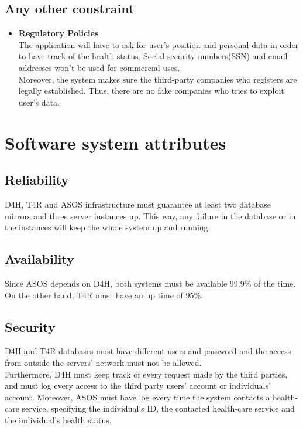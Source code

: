 \documentclass[a4paper, hidelinks, 12pt]{report}
\begin{document}
	\subsection{Any other constraint}
	\begin{itemize}
		\item{} \textbf{Regulatory Policies}\\
		The application will have to ask for user's position and personal data in order to have track of the health status. Social security numbers(SSN) and email addresses won't be used for commercial uses.\\
		
		Moreover, the system makes sure the third-party companies who registers are legally established. Thus, there are no fake companies who tries to exploit user's data.
	\end{itemize}
	
	\section{Software system attributes}	
	\subsection{Reliability}
	D4H, T4R and ASOS infrastructure must guarantee at least two database mirrors and three server instances up. This way, any failure in the database or in the instances will keep the whole system up and running.
	
	\subsection{Availability}
	Since ASOS depends on D4H, both systems must be available 99.9\% of the time. On the other hand, T4R must have an up time of 95\%.
	
	\subsection{Security}
	D4H and T4R databases must have different users and password and the access from outside the servers' network must not be allowed.\\
	
	Furthermore, D4H must keep track of every request made by the third parties, and must log every access to the third party users' account or individuals' account. Moreover, ASOS must have log every time the system contacts a health-care service, specifying the individual's ID, the contacted health-care service and the individual's health status. \\
	
\end{document}
